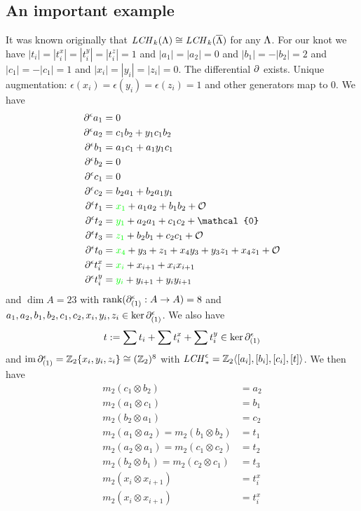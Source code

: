 \documentclass[11pt,oneside]{amsart}
\begin{document}
\subsection{An important example}
It was known originally that $\mathit{LCH}_k(\Lambda)\cong \mathit{LCH}_k(\overline{\Lambda})$ for any $\Lambda$. For our knot we have $|t_i|=|t_i^x|=|t_i^y|=|t_i^z|=1$ and $|a_1|=|a_2|=0$ and $|b_1|=-|b_2|=2$ and $|c_1|=-|c_1|=1$ and $|x_i|=|y_i|=|z_i|=0$. The differential $\partial$ exists. Unique augmentation: $\epsilon(x_i)=\epsilon(y_i)=\epsilon(z_i)=1$ and other generators  map to $0$.
We have
\begin{align*}
    \d^\epsilon a_1&=0\\
    \d^\epsilon a_2&=c_1b_2+y_1c_1b_2\\
    \d^\epsilon b_1&=a_1c_1+a_1y_1c_1\\
    \d^\epsilon b_2&=0\\
    \d^\epsilon c_1&=0\\
    \d^\epsilon c_2&=b_2a_1+b_2a_1y_1 \\
    \d^\epsilon t_1&={\color{green}x_1}+a_1a_2+b_1b_2+\mathcal{O}\\
    \d^\epsilon t_2&={\color{green}y_1}+a_2a_1+c_1c_2+ \mathcal{0}\\
    \d^\epsilon t_3&={\color{green}z_1}+b_2b_1+c_2c_1+\mathcal{O}\\
    \d^\epsilon t_0&={\color{green}x_4}+y_3+z_1+x_4y_3+y_3z_1+x_4z_1+\mathcal{O}\\
    \d^\epsilon t_i^x&={\color{green}x_i}+x_{i+1}+x_ix_{i+1}\\
    \d^\epsilon t_i^y&={\color{green}y_i}+y_{i+1}+y_i y_{i+1}\\
\end{align*}
and $\dim A=23$ with $\text{rank}(\partial_{(1)}^\epsilon: A\rightarrow A)=8$ and $a_1,a_2,b_1,b_2,c_1,c_2,x_i,y_i,z_i\in \ker{\partial_{(1)}^\epsilon}$. We also have
    \[t:=\sum t_i + \sum t_i^x + \sum t_i^y\in \ker \partial_{(1)}^\epsilon\]
and $\operatorname{im} \partial_{(1)}^\epsilon=\mathbb Z_2\{x_i,y_i,z_i\}\cong (\mathbb Z_2)^8$
with $\mathit{LCH}_{\ast}^\epsilon=\mathbb Z_2\langle[a_i],[b_i],[c_i],[t]\rangle$.
We then have
    \begin{align*}
        m_2(c_1\otimes b_2)&=a_2\\
        m_2(a_1\otimes c_1)&=b_1\\
        m_2(b_2\otimes a_1)&=c_2\\
        m_2(a_1\otimes a_2)=m_2(b_1\otimes b_2)&=t_1\\
        m_2(a_2\otimes a_1)=m_2(c_1\otimes c_2)&=t_2\\
        m_2(b_2\otimes b_1)=m_2(c_2\otimes c_1)&=t_3\\
        m_2(x_i\otimes x_{i+1})&=t_i^x\\
        m_2(x_i\otimes x_{i+1})&=t_i^x\\
    \end{align*}
\end{document}
